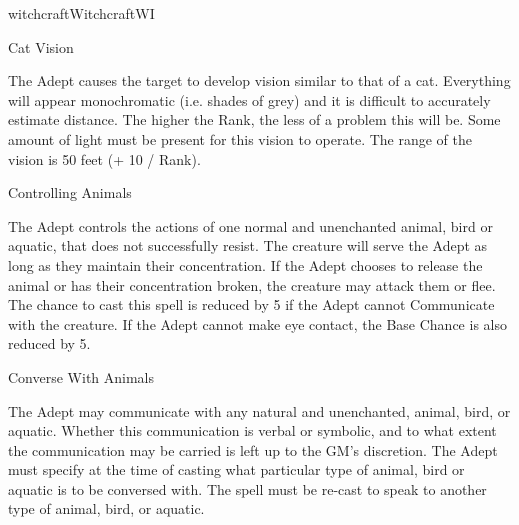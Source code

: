 \begin{College}[1.1]{witchcraft}{Witchcraft}{WI}
\begin{spell}[S-5]{Cat Vision}

\begin{effects}
The Adept causes the target to develop vision similar to that of a
cat.  Everything will appear monochromatic (i.e.  shades of grey) and
it is difficult to accurately estimate distance.  The higher the Rank,
the less of a problem this will be.  Some amount of light must be
present for this vision to operate. The range of the vision is 50 feet
(+ 10 / Rank).
\end{effects}
\end{spell}

\begin{spell}[S-6]{Controlling Animals}

\begin{effects}
The Adept controls the actions of one normal and unenchanted animal,
bird or aquatic, that does not successfully resist.  The creature will
serve the Adept as long as they maintain their concentration.  If the
Adept chooses to release the animal or has their concentration broken,
the creature may attack them or flee.  The chance to cast this spell
is reduced by 5 if the Adept cannot Communicate with the creature.  If
the Adept cannot make eye contact, the Base Chance is also reduced by
5.
\end{effects}
\end{spell}

\begin{spell}[S-7]{Converse With Animals}

\begin{effects}
The Adept may communicate with any natural and unenchanted, animal,
bird, or aquatic.  Whether this communication is verbal or symbolic,
and to what extent the communication may be carried is left up to the
GM’s discretion. The Adept must specify at the time of casting what
particular type of animal, bird or aquatic is to be conversed
with. The spell must be re-cast to speak to another type of animal,
bird, or aquatic.
\end{effects}
\end{spell}


\end{College}
